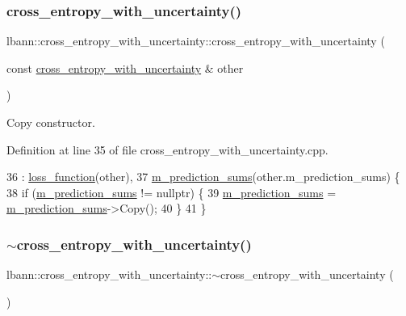 \subsubsection{\texorpdfstring{cross\+\_\+entropy\+\_\+with\+\_\+uncertainty()}{cross\_entropy\_with\_uncertainty()}\hspace{0.1cm}{\footnotesize\ttfamily [2/2]}}
{\footnotesize\ttfamily lbann\+::cross\+\_\+entropy\+\_\+with\+\_\+uncertainty\+::cross\+\_\+entropy\+\_\+with\+\_\+uncertainty (\begin{DoxyParamCaption}\item[{const \hyperlink{classlbann_1_1cross__entropy__with__uncertainty}{cross\+\_\+entropy\+\_\+with\+\_\+uncertainty} \&}]{other }\end{DoxyParamCaption})}

Copy constructor. 

Definition at line 35 of file cross\+\_\+entropy\+\_\+with\+\_\+uncertainty.\+cpp.


\begin{DoxyCode}
36   : \hyperlink{classlbann_1_1loss__function_a0c5745e661c59e3e5496888d233c07cf}{loss\_function}(other),
37     \hyperlink{classlbann_1_1cross__entropy__with__uncertainty_a4b45767c526e7ebe4a55ff1a1ddbd7ba}{m\_prediction\_sums}(other.m\_prediction\_sums) \{
38   \textcolor{keywordflow}{if} (\hyperlink{classlbann_1_1cross__entropy__with__uncertainty_a4b45767c526e7ebe4a55ff1a1ddbd7ba}{m\_prediction\_sums} != \textcolor{keyword}{nullptr}) \{
39     \hyperlink{classlbann_1_1cross__entropy__with__uncertainty_a4b45767c526e7ebe4a55ff1a1ddbd7ba}{m\_prediction\_sums} = \hyperlink{classlbann_1_1cross__entropy__with__uncertainty_a4b45767c526e7ebe4a55ff1a1ddbd7ba}{m\_prediction\_sums}->Copy();
40   \}
41 \}
\end{DoxyCode}
\mbox{\label{classlbann_1_1cross__entropy__with__uncertainty_a617b8a1a308c086284ca6f43e88acca6}} 
\subsubsection{\texorpdfstring{$\sim$cross\+\_\+entropy\+\_\+with\+\_\+uncertainty()}{~cross\_entropy\_with\_uncertainty()}}
{\footnotesize\ttfamily lbann\+::cross\+\_\+entropy\+\_\+with\+\_\+uncertainty\+::$\sim$cross\+\_\+entropy\+\_\+with\+\_\+uncertainty (\begin{DoxyParamCaption}{ }\end{DoxyParamCaption})\hspace{0.3cm}{\ttfamily [override]}}

